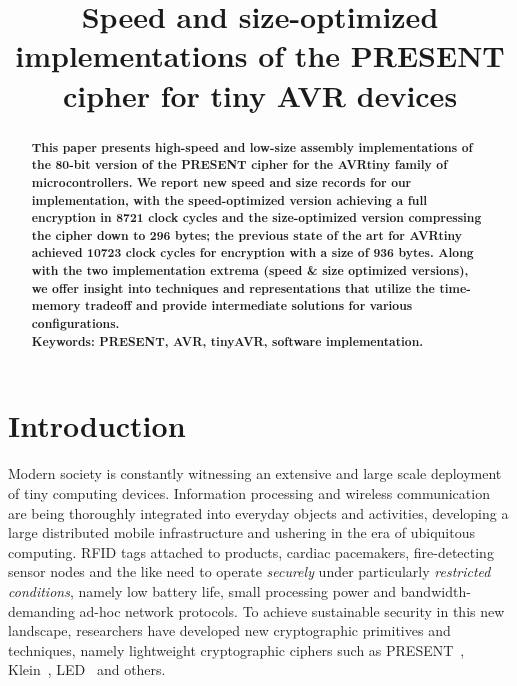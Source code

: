 \documentclass[11pt]{article}
\begin{document}
\title{Speed and size-optimized implementations of the PRESENT cipher for tiny AVR devices}

\author{}
\date{}
\maketitle

\begin{abstract}
\textbf{This paper presents high-speed and low-size assembly implementations of the 80-bit version of the PRESENT cipher for the AVRtiny family of microcontrollers. We report new speed and size records for our implementation, with the speed-optimized version achieving a full encryption in 8721 clock cycles and the size-optimized version compressing the cipher down to 296 bytes; the previous state of the art for AVRtiny achieved 10723 clock cycles for encryption with a size of 936 bytes. Along with the two implementation extrema (speed \& size optimized versions), we offer insight into techniques and representations that utilize the time-memory tradeoff and provide intermediate solutions for various configurations.\\Keywords: PRESENT, AVR, tinyAVR, software implementation.}
\end{abstract}
\section{Introduction}
Modern society is constantly witnessing an extensive and large scale deployment of tiny computing devices. Information processing and wireless communication are being thoroughly integrated into everyday objects and activities, developing a large distributed mobile infrastructure and ushering in the era of ubiquitous computing. RFID tags attached to products, cardiac pacemakers, fire-detecting sensor nodes and the like need to operate \emph{securely} under particularly \emph{restricted conditions}, namely low battery life, small processing power and bandwidth-demanding ad-hoc network protocols. To achieve sustainable security in this new landscape, researchers have developed new cryptographic primitives and techniques, namely lightweight cryptographic ciphers such as PRESENT~\cite{bogdanov2007present}, Klein~\cite{gong2012klein}, LED~\cite{guo2011led} and others.
\end{document}
